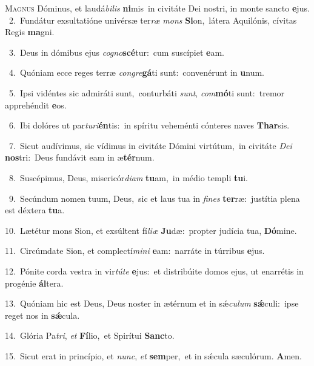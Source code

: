 \lettrine{\initial\textcolor{\initialcolor}{M}}{agnus} Dóminus, et laudá\-\textit{bi}\-\textit{lis} \textbf{ni}\-mis~\star in civitáte Dei nostri, in monte sancto \textbf{e}\-jus.\\
{\numbfont\textcolor{\numbcolor}{~2.}}~Fundátur exsultatióne univérsæ ter\textit{ræ} \textit{mons} \textbf{Si}\-on,~\star látera Aquilónis, cívitas Regis \textbf{ma}\-gni.\par
{\numbfont\textcolor{\numbcolor}{~3.}}~Deus in dómibus ejus \textit{co}\-\textit{gno}\textbf{scé}tur:~\star cum suscípiet \textbf{e}\-am.\par
{\numbfont\textcolor{\numbcolor}{~4.}}~Quóniam ecce reges terræ \textit{con}\-\textit{gre}\textbf{gá}ti sunt:~\star convenérunt in \textbf{u}\-num.\par
{\numbfont\textcolor{\numbcolor}{~5.}}~Ipsi vidéntes sic admiráti sunt,~\dagger conturbáti \textit{sunt}\-, \textit{com}\-\textbf{mó}ti sunt:~\star tremor apprehéndit \textbf{e}\-os.\par
{\numbfont\textcolor{\numbcolor}{~6.}}~Ibi dolóres ut par\-\textit{tu}\-\textit{ri}\textbf{én}tis:~\star in spíritu veheménti cónteres naves \textbf{Thar}\-sis.\par
{\numbfont\textcolor{\numbcolor}{~7.}}~Sicut audívimus, sic vídimus in civitáte Dómini virtútum,~\dagger in civitáte \textit{De}\-\textit{i} \textbf{nos}\-tri:~\star Deus fundávit eam in æ\-\textbf{tér}\-num.\par
{\numbfont\textcolor{\numbcolor}{~8.}}~Suscépimus, Deus, misericór\-\textit{di}\-\textit{am} \textbf{tu}\-am,~\star in médio templi \textbf{tu}\-i.\par
{\numbfont\textcolor{\numbcolor}{~9.}}~Secúndum nomen tuum, Deus,~\dagger sic et laus tua in \textit{fi}\-\textit{nes} \textbf{ter}\-ræ:~\star justítia plena est déxtera \textbf{tu}\-a.\par
{\numbfont\textcolor{\numbcolor}{10.}}~Lætétur mons Sion, et exsúltent fí\-\textit{li}\-\textit{æ} \textbf{Ju}\-dæ:~\star propter judícia tua, \textbf{Dó}\-mine.\par
{\numbfont\textcolor{\numbcolor}{11.}}~Circúmdate Sion, et complectí\-\textit{mi}\-\textit{ni} \textbf{e}\-am:~\star narráte in túrribus \textbf{e}\-jus.\par
{\numbfont\textcolor{\numbcolor}{12.}}~Pónite corda vestra in vir\-\textit{tú}\-\textit{te} \textbf{e}\-jus:~\star et distribúite domos ejus, ut enarrétis in progénie \textbf{ál}\-tera.\par
{\numbfont\textcolor{\numbcolor}{13.}}~Quóniam hic est Deus, Deus noster in ætérnum et in sǽ\-\textit{cu}\-\textit{lum} \textbf{sǽ}\-culi:~\star ipse reget nos in \textbf{sǽ}\-cula.\par
{\numbfont\textcolor{\numbcolor}{14.}}~Glória Pa\-\textit{tri}\-, \textit{et} \textbf{Fí}\-lio,~\star et Spirítui \textbf{Sanc}\-to.\par
{\numbfont\textcolor{\numbcolor}{15.}}~Sicut erat in princípio, et \textit{nunc}\-, \textit{et} \textbf{sem}\-per,~\star et in sǽcula sæculórum. \textbf{A}\-men.\par
